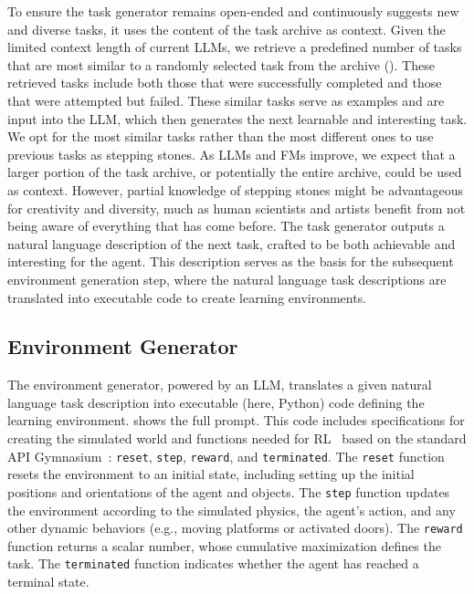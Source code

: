 \documentclass{article} %
\begin{document}
To ensure the task generator remains open-ended and continuously suggests new and diverse tasks, it uses the content of the task archive as context. Given the limited context length of current LLMs, we retrieve a predefined number of tasks that are most similar to a randomly selected task from the archive (). These retrieved tasks include both those that were successfully completed and those that were attempted but failed. These similar tasks serve as examples and are input into the LLM, which then generates the next learnable and interesting task. We opt for the most similar tasks rather than the most different ones to use previous tasks as stepping stones. As LLMs and FMs improve, we expect that a larger portion of the task archive, or potentially the entire archive, could be used as context. However, partial knowledge of stepping stones might be advantageous for creativity and diversity, much as human scientists and artists benefit from not being aware of everything that has come before. The task generator outputs a natural language description of the next task, crafted to be both achievable and interesting for the agent. This description serves as the basis for the subsequent environment generation step, where the natural language task descriptions are translated into executable code to create learning environments.

\vspace{-5pt}
\subsection{Environment Generator}
\label{subsec:environment generator}
\vspace{-4pt}

The environment generator, powered by an LLM, translates a given natural language task description into executable (here, Python) code defining the learning environment.  shows the full prompt. This code includes specifications for creating the simulated world and functions needed for RL~\citep{sutton_ReinforcementLearningIntroduction_2018} based on the standard API Gymnasium~\citep{towers_gymnasium_2023}: \texttt{reset}, \texttt{step}, \texttt{reward}, and \texttt{terminated}. The \texttt{reset} function resets the environment to an initial state, including setting up the initial positions and orientations of the agent and objects. The \texttt{step} function updates the environment according to the simulated physics, the agent's action, and any other dynamic behaviors (e.g., moving platforms or activated doors). The \texttt{reward} function returns a scalar number, whose cumulative maximization defines the task. The \texttt{terminated} function indicates whether the agent has reached a terminal state.
\end{document}
